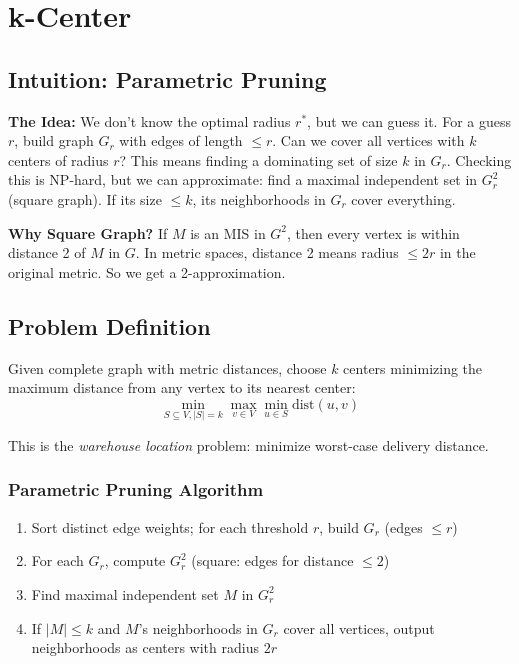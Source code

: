 \setcounter{chapter}{4}
\chapter{k-Center}
\label{ch:kcenter}

\section{Intuition: Parametric Pruning}

\begin{intuitionbox}
\textbf{The Idea:} We don't know the optimal radius $r^*$, but we can guess it. For a guess $r$, build graph $G_r$ with edges of length $\leq r$. Can we cover all vertices with $k$ centers of radius $r$? This means finding a dominating set of size $k$ in $G_r$. Checking this is NP-hard, but we can approximate: find a maximal independent set in $G_r^2$ (square graph). If its size $\leq k$, its neighborhoods in $G_r$ cover everything.

\textbf{Why Square Graph?} If $M$ is an MIS in $G^2$, then every vertex is within distance 2 of $M$ in $G$. In metric spaces, distance 2 means radius $\leq 2r$ in the original metric. So we get a 2-approximation.
\end{intuitionbox}

\section{Problem Definition}

\begin{definition}
Given complete graph with metric distances, choose $k$ centers minimizing the maximum distance from any vertex to its nearest center:
\[
\min_{S \subseteq V, |S|=k} \max_{v \in V} \min_{u \in S} \text{dist}(u, v)
\]
\end{definition}

This is the \emph{warehouse location} problem: minimize worst-case delivery distance.

\subsection{Parametric Pruning Algorithm}

\begin{algorithmdef}
\begin{enumerate}
    \item Sort distinct edge weights; for each threshold $r$, build $G_r$ (edges $\leq r$)
    \item For each $G_r$, compute $G_r^2$ (square: edges for distance $\leq 2$)
    \item Find maximal independent set $M$ in $G_r^2$
    \item If $|M| \leq k$ and $M$'s neighborhoods in $G_r$ cover all vertices, output neighborhoods as centers with radius $2r$
\end{enumerate}
\end{algorithmdef}

